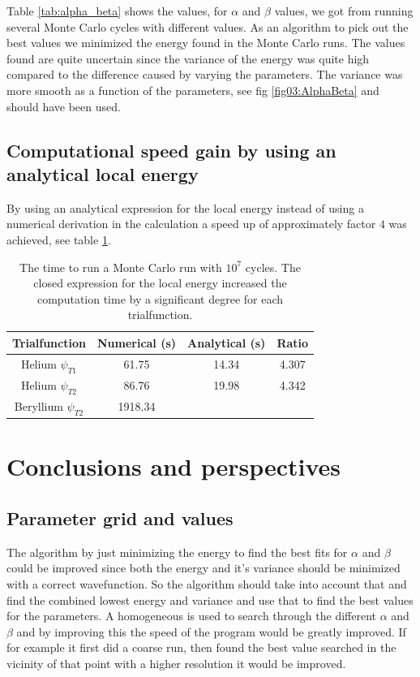 \documentclass[11pt]{article}
\begin{document}
	Table \ref{tab:alpha_beta} shows the values, for \(\alpha\) and \(\beta\) values, we got from  running several Monte Carlo cycles with different values. As an algorithm to pick out the best values we minimized the energy found in the Monte Carlo runs. The values found are quite uncertain since the variance of the energy was quite high compared to the difference caused by varying the parameters. The variance was more smooth as a function of the parameters, see fig \ref{fig03:AlphaBeta} and should have been used.


	\subsection{Computational speed gain by using an analytical local energy}
	By using an analytical expression for the local energy instead of using a numerical derivation in the calculation a speed up of approximately factor \(4\) was achieved, see table \ref{tab:analyticVSNumeric}. 


	\begin{table}
\center
		\begin{tabular}{| c | c | c | c |}
		    \hline
		   	\textbf{Trialfunction} & Numerical (s) & Analytical (s) & Ratio
		    \\ \hline
		    Helium $\psi_{T1}$ & 61.75 & 14.34 & 4.307
		    \\ \hline 
		    Helium $\psi_{T2}$ & 86.76 & 19.98	& 4.342
		    \\	\hline 
		    Beryllium $\psi_{T2}$ & 1918.34  &	 &
 		    \\ \hline
	  \end{tabular}
	  \caption{The time to run a Monte Carlo run with \(10^7\) cycles. The closed expression for the local energy increased the computation time by a significant degree for each trialfunction. }
	  \label{tab:analyticVSNumeric}
\end{table}

\section{Conclusions and perspectives}

	\subsection{Parameter grid  and values }
		The algorithm by just minimizing the energy to find the best fits for \(\alpha\) and \(\beta\) could be improved since both the energy and it's variance should be minimized with a correct wavefunction. So the algorithm should take into account that and find the combined lowest energy and variance and use that to find the best values for the parameters. A homogeneous is used to search through the different \(\alpha\) and \(\beta\) and by improving this the speed of the program would be greatly improved. If for example it first did a coarse run, then found the best value searched in the vicinity of that point with a higher resolution it would be improved.
\end{document}
